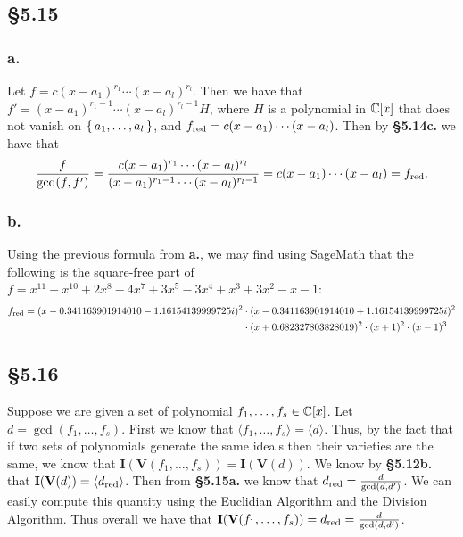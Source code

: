 \documentclass[letterpaper]{article}
\begin{document}
\clearpage

\subsection*{\S 5.15}

\subsubsection*{a.}

Let $f = c(x - a_{1})^{r_{1}} \cdots (x - a_{l})^{r_{l}}$.
Then we have that $f' = (x - a_{1})^{r_{1} - 1} \cdots (x - a_{l})^{r_{l} - 1} H$, where $H$ is a polynomial in $\mathbb{C}[x]$ that does not vanish on $\set{a_{1}, \ldots, a_{l}}$, and $f_{\text{red}} = c (x - a_{1}) \cdots (x - a_{l})$.
Then by \textbf{\S 5.14c.} we have that
\[
  \frac{f}{\gcd(f, f')} = \frac{c(x - a_{1})^{r_{1}} \cdots (x - a_{l})^{r_{l}}}{(x - a_{1})^{r_{1} - 1} \cdots (x - a_{l})^{r_{l} - 1}} = c (x - a_{1}) \cdots (x - a_{l}) = f_{\text{red}}.
\]

\subsubsection*{b.}

Using the previous formula from \textbf{a.}, we may find using SageMath that the following is the square-free part of $f = x^{11} - x^{10} + 2x^{8} - 4x^{7} + 3x^{5} - 3x^{4} + x^{3} + 3x^{2} - x - 1$:
\begin{equation*}
\begin{split}
  f_{\text{red}} = (x - 0.341163901914010 - 1.16154139999725i)^{2} &\cdot (x - 0.341163901914010 + 1.16154139999725i)^{2} \\
    &\cdot (x + 0.682327803828019)^{2} \cdot (x + 1)^{2} \cdot (x - 1)^{3}
\end{split}
\end{equation*}

\subsection*{\S 5.16}

Suppose we are given a set of polynomial $f_{1}, \ldots, f_{s} \in \mathbb{C}[x]$.
Let $d = \gcd(f_{1}, \ldots, f_{s})$.
First we know that $\langle f_{1}, \ldots, f_{s} \rangle = \langle d \rangle$.
Thus, by the fact that if two sets of polynomials generate the same ideals then their varieties are the same, we know that $\mathbf{I}(\textbf{V}(f_{1}, \ldots, f_{s})) = \mathbf{I}(\textbf{V}(d))$.
We know by \textbf{\S 5.12b.} that $\mathbf{I}(\textbf{V}(d)) = \langle d_{\text{red}} \rangle$.
Then from \textbf{\S 5.15a.} we know that $d_{\text{red}} = \frac{d}{\gcd(d, d')}$.
We can easily compute this quantity using the Euclidian Algorithm and the Division Algorithm.
Thus overall we have that $\mathbf{I}(\textbf{V}(f_{1}, \ldots, f_{s})) = \ideal{d_{\red}} = \ideal{\frac{d}{\gcd(d, d')}}$.
\end{document}
